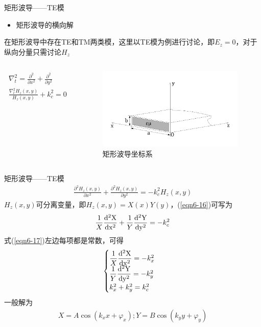 \begin{frame}{矩形波导——TE模}
    \begin{itemize}
        \item 矩形波导的横向解
    \end{itemize}
    在矩形波导中存在TE和TM两类模，这里以TE模为例进行讨论，即$E_z=0$，对于纵向分量只需讨论$H_z$
    \begin{columns}
        \begin{column}{0.4\linewidth}
            \begin{align*}
                \nabla_t^2=\frac{\partial^2}{\partial x^2}+\frac{\partial^2}{\partial y^2} \\
                \frac{\nabla_t^2H_z(x,y)}{H_z(x,y)}+k_c^2=0
            \end{align*}
        \end{column}
        \begin{column}{0.6\linewidth}
            \begin{figure}
                \includegraphics[width=7cm]{Cha6//fig6-3.pdf}
                \caption{矩形波导坐标系}
            \end{figure}
        \end{column}
    \end{columns}
\end{frame}

\begin{frame}{矩形波导——TE模}
    \begin{align}
        \frac{\partial^2H_z(x,y)}{\partial x^2}+\frac{\partial^2H_z(x,y)}{\partial y^2}=-k_c^2H_z(x,y)
        \label{eqn6-16}
    \end{align}
    $H_z(x,y)$可分离变量，即$H_z(x,y)=X(x)Y(y)$，(\ref{eqn6-16})可写为
    \begin{align}
        \frac{1}{X}\frac{\rm{d}^2X}{\rm{d}x^2}+\frac{1}{Y}\frac{\rm{d}^2Y}{\rm{d}y^2}=-k_c^2
        \label{eqn6-17}
    \end{align}
    式(\ref{eqn6-17})左边每项都是常数，可得
    \begin{align}
        \begin{cases}
            \dfrac{1}{X}\dfrac{\rm{d}^2X}{\rm{d}x^2}=-k_x^2 \\
            \dfrac{1}{Y}\dfrac{\rm{d}^2Y}{\rm{d}y^2}=-k_y^2 \\
            k_x^2+k_y^2=k_c^2
        \end{cases}
    \end{align}
    一般解为
    \begin{align*}
        X=A\cos(k_x x+\varphi_x);Y=B\cos(k_y y+\varphi_y)
    \end{align*}

\end{frame}

